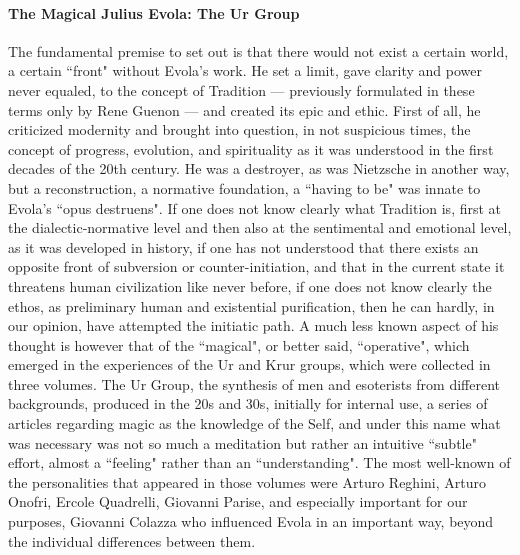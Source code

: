 \paragraph{The Magical Julius Evola: The Ur Group}
The fundamental premise to set out is that there would not exist a certain world, a certain ``front" without Evola's work. He set a limit, gave clarity and power never equaled, to the concept of Tradition — previously formulated in these terms only by Rene Guenon — and created its epic and ethic. First of all, he criticized modernity and brought into question, in not suspicious times, the concept of progress, evolution, and spirituality as it was understood in the first decades of the 20th century. He was a destroyer, as was Nietzsche in another way, but a reconstruction, a normative foundation, a ``having to be" was innate to Evola's ``opus destruens". If one does not know clearly what Tradition is, first at the dialectic-normative level and then also at the sentimental and emotional level, as it was developed in history, if one has not understood that there exists an opposite front of subversion or counter-initiation, and that in the current state it threatens human civilization like never before, if one does not know clearly the ethos, as preliminary human and existential purification, then he can hardly, in our opinion, have attempted the initiatic path. A much less known aspect of his thought is however that of the ``magical", or better said, ``operative", which emerged in the experiences of the Ur and Krur groups, which were collected in three volumes. The Ur Group, the synthesis of men and esoterists from different backgrounds, produced in the 20s and 30s, initially for internal use, a series of articles regarding magic as the knowledge of the Self, and under this name what was necessary was not so much a meditation but rather an intuitive ``subtle" effort, almost a ``feeling" rather than an ``understanding". The most well-known of the personalities that appeared in those volumes were Arturo Reghini, Arturo Onofri, Ercole Quadrelli, Giovanni Parise, and especially important for our purposes, Giovanni Colazza who influenced Evola in an important way, beyond the individual differences between them.

